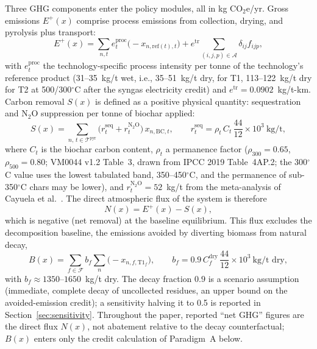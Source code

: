 Three GHG components enter the policy modules, all in kg CO$_2$e/yr. Gross
emissions $E^{+}(x)$ comprise process emissions from collection, drying, and
pyrolysis plus transport:
\begin{equation}
E^{+}(x)=\sum_{n,t} e^{\mathrm{proc}}_{t}\bigl(-x_{n,\mathrm{ref}(t),t}\bigr)
+ e^{\mathrm{tr}}\sum_{(i,j,p)\in\mathcal{A}}\delta_{ij}f_{ijp},
\end{equation}
with $e^{\mathrm{proc}}_t$ the technology-specific process intensity per
tonne of the technology's reference product (31--35~kg/t wet, i.e.,
35--51~kg/t dry, for T1, 113--122~kg/t dry for T2 at 500/300$^\circ$C after
the syngas electricity credit)
and $e^{\mathrm{tr}}=0.0902$~kg/t-km. Carbon removal $S(x)$ is defined as a
positive physical quantity: sequestration and N$_2$O suppression per
tonne of biochar applied:
\begin{equation}
S(x)=\sum_{n,\,t\in\mathcal{T}^{\mathrm{pyr}}}
\bigl(r^{\mathrm{seq}}_{t}+r^{\mathrm{N}_2\mathrm{O}}_{t}\bigr)\,x_{n,\mathrm{BC},t},
\qquad
r^{\mathrm{seq}}_{t}=\rho_t\,C_t\,\frac{44}{12}\times 10^{3}\ \text{kg/t},
\end{equation}
where $C_t$ is the biochar carbon content, $\rho_t$ a permanence factor
($\rho_{300}=0.65$, $\rho_{500}=0.80$; VM0044 v1.2 Table~3, drawn from IPCC
2019 Table~4AP.2; the 300$^\circ$C value uses the lowest tabulated band,
350--450$^\circ$C, and the permanence of sub-350$^\circ$C chars may be lower),
and $r^{\mathrm{N}_2\mathrm{O}}_{t}=52$~kg/t from the
meta-analysis of Cayuela et al.~\cite{cayuela2014}. The direct atmospheric flux of the system is therefore
\begin{equation}
N(x)=E^{+}(x)-S(x),
\end{equation}
which is negative (net removal) at the baseline equilibrium. This flux
excludes the decomposition baseline, the emissions avoided by diverting
biomass from natural decay,
\begin{equation}
B(x)=\sum_{f\in\mathcal{F}} b_f \sum_{n}\bigl(-x_{n,f,\mathrm{T1}_f}\bigr),
\qquad b_f = 0.9\,C_f^{\mathrm{dry}}\,\frac{44}{12}\times 10^{3}\ \text{kg/t dry},
\end{equation}
with $b_f \approx 1350$--$1650$~kg/t dry. The decay fraction $0.9$ is a
scenario assumption (immediate, complete decay of uncollected residues, an
upper bound on the avoided-emission credit); a sensitivity halving it to 0.5 is
reported in Section~\ref{sec:sensitivity}. Throughout the paper, reported
``net GHG'' figures are the direct flux $N(x)$, not abatement relative to
the decay counterfactual; $B(x)$ enters only the credit calculation of
Paradigm~A below.


